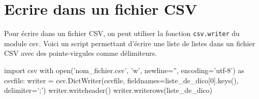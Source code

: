 \section{Ecrire dans un fichier CSV}

Pour écrire dans un fichier CSV, on peut utiliser la fonction \verb|csv.writer| du module csv. Voici un script permettant d'écrire une liste de listes dans un fichier CSV avec des points-virgules comme délimiteurs.	
\begin{CodePythontexAlt}[TaillePolice=\normalsize, Largeur=1\linewidth,Centre,PremLigne=1, Lignes=false,]{}
import csv	
with open('nom_fichier.csv', 'w', newline='', encoding='utf-8') as csvfile:
	writer = csv.DictWriter(csvfile, fieldnames=liste_de_dico[0].keys(), delimiter=';')
	writer.writeheader()
	writer.writerows(liste_de_dico)
\end{CodePythontexAlt}
